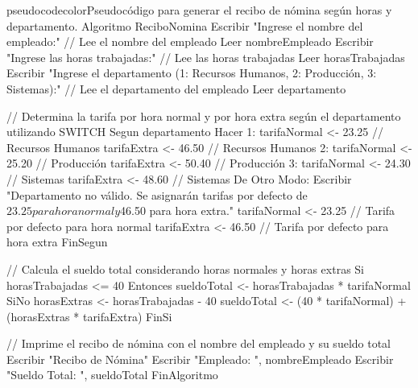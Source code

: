 \begin{sourcecode}{pseudocodecolor}{Pseudocódigo para generar el recibo de nómina según horas y departamento.}
Algoritmo ReciboNomina
    Escribir "Ingrese el nombre del empleado:"
    // Lee el nombre del empleado
    Leer nombreEmpleado
    Escribir "Ingrese las horas trabajadas:"
    // Lee las horas trabajadas
    Leer horasTrabajadas
    Escribir "Ingrese el departamento (1: Recursos Humanos, 2: Producción, 3: Sistemas):"
    // Lee el departamento del empleado
    Leer departamento
    
    // Determina la tarifa por hora normal y por hora extra según el departamento utilizando SWITCH
    Segun departamento Hacer
        1: 
            tarifaNormal <- 23.25 // Recursos Humanos
            tarifaExtra <- 46.50 // Recursos Humanos
        2: 
            tarifaNormal <- 25.20 // Producción
            tarifaExtra <- 50.40 // Producción
        3: 
            tarifaNormal <- 24.30 // Sistemas
            tarifaExtra <- 48.60 // Sistemas
        De Otro Modo:
            Escribir "Departamento no válido. Se asignarán tarifas por defecto de $23.25 para hora normal y $46.50 para hora extra."
            tarifaNormal <- 23.25 // Tarifa por defecto para hora normal
            tarifaExtra <- 46.50 // Tarifa por defecto para hora extra
    FinSegun
    
    // Calcula el sueldo total considerando horas normales y horas extras
    Si horasTrabajadas <= 40 Entonces
        sueldoTotal <- horasTrabajadas * tarifaNormal
    SiNo
        horasExtras <- horasTrabajadas - 40
        sueldoTotal <- (40 * tarifaNormal) + (horasExtras * tarifaExtra)
    FinSi
    
    // Imprime el recibo de nómina con el nombre del empleado y su sueldo total
    Escribir "Recibo de Nómina"
    Escribir "Empleado: ", nombreEmpleado
    Escribir "Sueldo Total: ", sueldoTotal
FinAlgoritmo
\end{sourcecode}


